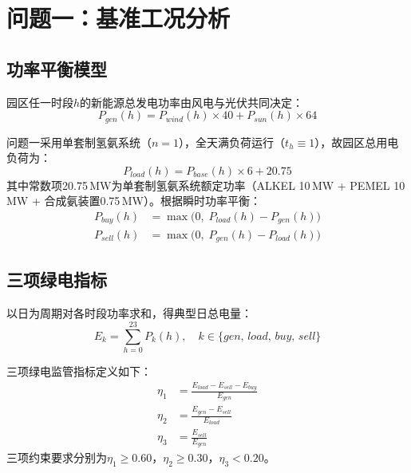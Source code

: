 \documentclass[UTF8,12pt,a4paper]{ctexart}
\begin{document}
\section{问题一：基准工况分析}

\subsection{功率平衡模型}

园区任一时段$h$的新能源总发电功率由风电与光伏共同决定：
\begin{equation}
  P_{gen}(h) = P_{wind}(h)\times 40 + P_{sun}(h)\times 64
  \label{eq:gen}
\end{equation}

问题一采用单套制氢氨系统（$n=1$），全天满负荷运行（$t_h\equiv1$），故园区总用电负荷为：
\begin{equation}
  P_{load}(h) = P_{base}(h)\times 6 + 20.75
  \label{eq:load1}
\end{equation}
其中常数项20.75\,MW为单套制氢氨系统额定功率（ALKEL 10\,MW + PEMEL 10\,MW + 合成氨装置0.75\,MW）。根据瞬时功率平衡：
\begin{align}
  P_{buy}(h)  &= \max\!\bigl(0,\; P_{load}(h) - P_{gen}(h)\bigr) \label{eq:buy} \\
  P_{sell}(h) &= \max\!\bigl(0,\; P_{gen}(h) - P_{load}(h)\bigr) \label{eq:sell}
\end{align}

\subsection{三项绿电指标}

以日为周期对各时段功率求和，得典型日总电量：
\begin{equation}
  E_{k} = \sum_{h=0}^{23} P_k(h), \quad k\in\{gen,\,load,\,buy,\,sell\}
  \label{eq:daily}
\end{equation}

三项绿电监管指标定义如下：
\begin{align}
  \eta_1 &= \frac{E_{load} - E_{sell} - E_{buy}}{E_{gen}} \label{eq:eta1} \\[4pt]
  \eta_2 &= \frac{E_{gen}  - E_{sell}}{E_{load}} \label{eq:eta2} \\[4pt]
  \eta_3 &= \frac{E_{sell}}{E_{gen}} \label{eq:eta3}
\end{align}
三项约束要求分别为$\eta_1\geq0.60$，$\eta_2\geq0.30$，$\eta_3<0.20$。
\end{document}
